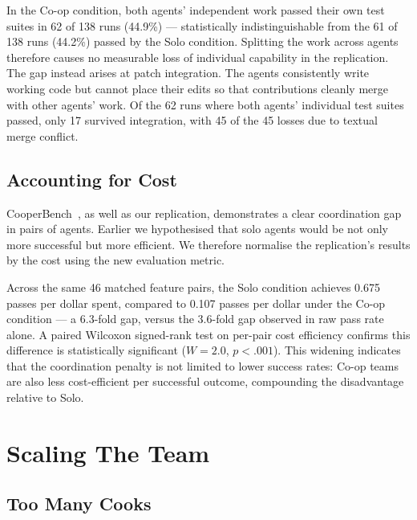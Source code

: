 \documentclass[11pt,a4paper]{article}
\begin{document}
In the Co-op condition, both agents' independent work passed their own test suites in 62 of 138 runs (44.9\%) --- statistically indistinguishable from the 61 of 138 runs (44.2\%) passed by the Solo condition. Splitting the work across agents therefore causes no measurable loss of individual capability in the replication. The gap instead arises at patch integration. The agents consistently write working code but cannot place their edits so that contributions cleanly merge with other agents' work. Of the 62 runs where both agents' individual test suites passed, only 17 survived integration, with 45 of the 45 losses due to textual merge conflict.

\subsection{Accounting for Cost}\label{sec:replcost}

CooperBench~\cite{khatua2026cooperbench}, as well as our replication, demonstrates a clear coordination gap in pairs of agents. Earlier we hypothesised that solo agents would be not only more successful but more efficient. We therefore normalise the replication's results by the cost using the new evaluation metric.

Across the same 46 matched feature pairs, the Solo condition achieves 0.675 passes per dollar spent, compared to 0.107 passes per dollar under the Co-op condition --- a 6.3-fold gap, versus the 3.6-fold gap observed in raw pass rate alone. A paired Wilcoxon signed-rank test on per-pair cost efficiency confirms this difference is statistically significant ($W = 2.0$, $p < .001$). This widening indicates that the coordination penalty is not limited to lower success rates: Co-op teams are also less cost-efficient per successful outcome, compounding the disadvantage relative to Solo.

%
%
\FloatBarrier
\section{Scaling The Team}\label{sec:growth}

\subsection{Too Many Cooks}\label{sec:toomanycooks}
\end{document}
